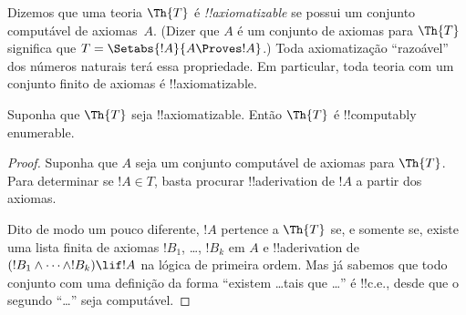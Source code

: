 \documentclass[../../../include/open-logic-section]{subfiles}
\begin{document}


Dizemos que uma teoria $\Th{T}$ é \emph{!!{axiomatizable}} se possui
um conjunto computável de axiomas~$A$. (Dizer que $A$ é um conjunto de
axiomas para $\Th{T}$ significa que
$T = \Setabs{!A}{A \Proves !A}$.) Toda axiomatização ``razoável'' dos
números naturais terá essa propriedade. Em particular, toda teoria com
um conjunto finito de axiomas é !!{axiomatizable}.

\begin{lem}
Suponha que $\Th{T}$ seja !!{axiomatizable}. Então $\Th{T}$ é
!!{computably enumerable}.
\end{lem}

\begin{proof}
Suponha que $A$ seja um conjunto computável de axiomas para $\Th{T}$.
Para determinar se $!A \in T$, basta procurar !!a{derivation} de $!A$
a partir dos axiomas.

Dito de modo um pouco diferente, $!A$ pertence a $\Th{T}$ se, e
somente se, existe uma lista finita de axiomas $!B_1$, \dots, $!B_k$
em $A$ e !!a{derivation} de
$(!B_1 \land \dots \land !B_k) \lif !A$ na lógica de primeira ordem.
Mas já sabemos que todo conjunto com uma definição da forma ``existem
\dots tais que \dots'' é !!{c.e.}, desde que o segundo ``\dots'' seja
computável.
\end{proof}
\end{document}
